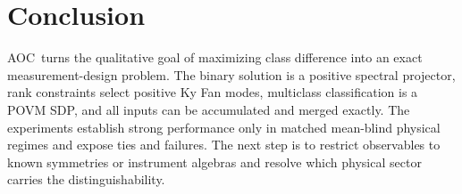 \documentclass[letterpaper,journal]{IEEEtran}
\newcommand{\AOC}{\textsc{AOC}}
\begin{document}
\section{Conclusion}

\AOC\ turns the qualitative goal of maximizing class difference into an exact
measurement-design problem. The binary solution is a positive spectral
projector, rank constraints select positive Ky Fan modes, multiclass
classification is a POVM SDP, and all inputs can be accumulated and merged
exactly. The experiments establish strong performance only in matched
mean-blind physical regimes and expose ties and failures. The next step is to
restrict observables to known symmetries or instrument algebras and resolve
which physical sector carries the distinguishability.



\end{document}
